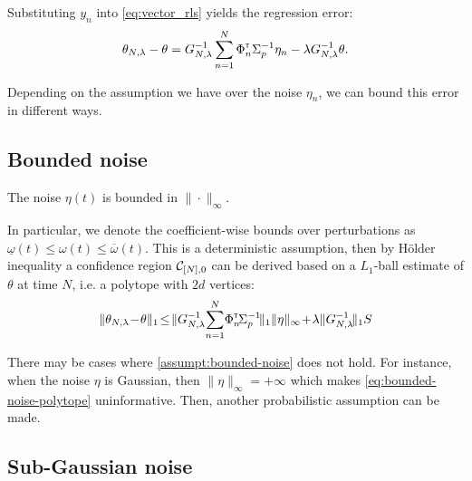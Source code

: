 Substituting $y_n$ into \eqref{eq:vector_rls} yields the regression error:
\begin{align}
\theta_{N,\lambda} - \theta = G_{N, \lambda}^{-1}\sum_{n=1}^N \Phi_n^{\mathsf{\scriptscriptstyle T}} \Sigma_p^{-1}\eta_n - \lambda G_{N, \lambda}^{-1}\theta.
\end{align}


Depending on the assumption we have over the noise $\eta_n$, we can bound this error in different ways.


\subsection{Bounded noise}

\begin{assumption}
	\label{assumpt:bounded-noise}
	\begin{leftbar}[assumptionbar]
	The noise $\eta(t)$ is bounded in $\|\cdot\|_\infty$.
	\end{leftbar}
\end{assumption}

In particular, we denote the coefficient-wise bounds over perturbations as $\underline{\omega}(t) \leq \omega(t) \leq \overline{\omega}(t)$. This is a deterministic assumption, then by Hölder inequality a confidence region $\mathcal{C}_{[N],0}$ can be derived based on a $L_1$-ball estimate of $\theta$ at time $N$, i.e. a polytope with $2d$ vertices:
\begin{equation}
\label{eq:bounded-noise-polytope}
\|\theta_{N,\lambda}\! -\! \theta\|_1\! \leq \! \|G_{N, \lambda}^{-1}\!\sum_{n=1}^N \!\Phi_n^\transp\! \Sigma_p^{-1}\!\|_1\|\eta\|_\infty\! +\!\lambda\|G_{N, \lambda}^{-1}\!\|_1S
\end{equation}

There may be cases where \autoref{assumpt:bounded-noise} does not hold. For instance, when the noise $\eta$ is Gaussian, then $\|\eta\|_\infty=+\infty$ which makes \eqref{eq:bounded-noise-polytope} uninformative. Then, another probabilistic assumption can be made.

\subsection{Sub-Gaussian noise}


